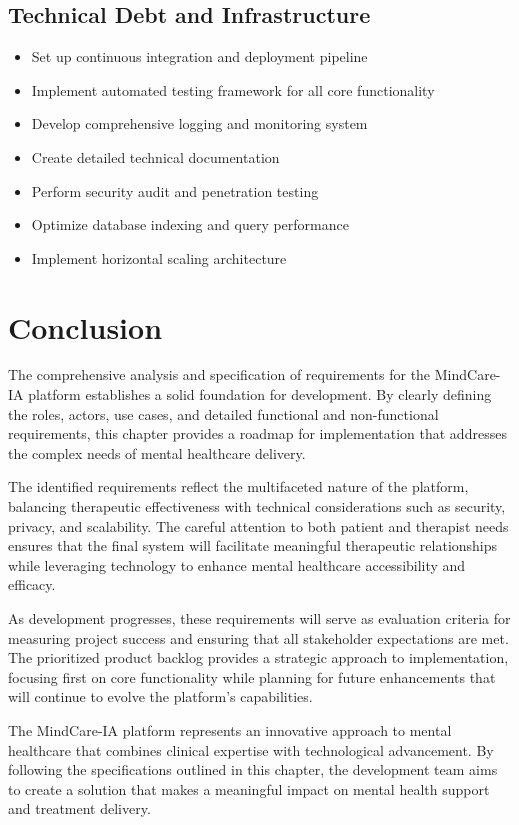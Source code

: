 \subsection{Technical Debt and Infrastructure}
\begin{itemize}
    \item Set up continuous integration and deployment pipeline
    \item Implement automated testing framework for all core functionality
    \item Develop comprehensive logging and monitoring system
    \item Create detailed technical documentation
    \item Perform security audit and penetration testing
    \item Optimize database indexing and query performance
    \item Implement horizontal scaling architecture
\end{itemize}

\section{Conclusion}
The comprehensive analysis and specification of requirements for the MindCare-IA platform establishes a solid foundation for development. By clearly defining the roles, actors, use cases, and detailed functional and non-functional requirements, this chapter provides a roadmap for implementation that addresses the complex needs of mental healthcare delivery.

The identified requirements reflect the multifaceted nature of the platform, balancing therapeutic effectiveness with technical considerations such as security, privacy, and scalability. The careful attention to both patient and therapist needs ensures that the final system will facilitate meaningful therapeutic relationships while leveraging technology to enhance mental healthcare accessibility and efficacy.

As development progresses, these requirements will serve as evaluation criteria for measuring project success and ensuring that all stakeholder expectations are met. The prioritized product backlog provides a strategic approach to implementation, focusing first on core functionality while planning for future enhancements that will continue to evolve the platform's capabilities.

The MindCare-IA platform represents an innovative approach to mental healthcare that combines clinical expertise with technological advancement. By following the specifications outlined in this chapter, the development team aims to create a solution that makes a meaningful impact on mental health support and treatment delivery.